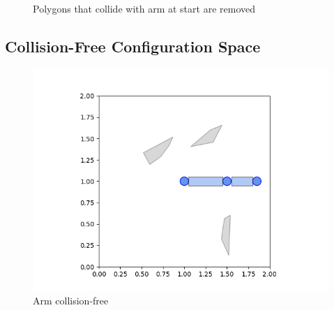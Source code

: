 \documentclass{article}
\begin{document}
\begin{figure}[htbp]
\begin{minipage}{0.45\textwidth}
  \end{minipage}
    \caption{Polygons that collide with arm at start are removed}
\end{figure}

\subsection{Collision-Free Configuration Space}
\begin{figure}[htbp]
  \centering
  \begin{minipage}{0.45\textwidth}
    \includegraphics[width=\linewidth]{part4_arm_free.png}
    \caption{Arm collision-free}
  \end{minipage}\hfill
\end{figure}
\end{document}
